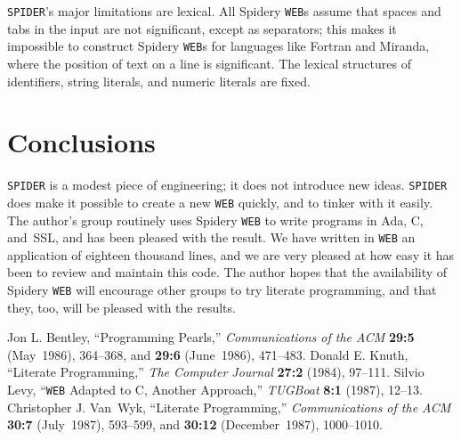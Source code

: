 {\tt SPIDER}'s major limitations are lexical.
 All Spidery {\tt WEB}s
assume that spaces and tabs in the input are not significant, except
as separators;
this makes it impossible to construct Spidery {\tt WEB}s for languages
like Fortran and Miranda, where the position of text on a line is
significant.
The lexical structures of identifiers, string literals, and numeric
literals are fixed.

\section{Conclusions}
{\tt SPIDER} is a modest piece of engineering; it does not introduce
new ideas.
{\tt SPIDER}  does make it possible to create a new {\tt WEB} quickly,
and to tinker with it easily.
The author's group routinely uses Spidery {\tt WEB} to write programs
in Ada, C, and~SSL, and has been pleased with the result.
We have written in {\tt WEB} an application of eighteen thousand
lines, and
we are very pleased at how easy it has been to review and maintain
this code.
The author hopes that the availability of Spidery {\tt WEB} will
encourage other groups to try literate programming, and that they,
too, will be pleased with the results.



\begin{thebibliography}{Van~Wyk~9999}
Jon L. Bentley, ``Programming Pearls,''
{\sl Communications of the ACM} {\bf 29:5} (May~1986), 364--368, and
{\bf 29:6} (June~1986), 471--483.
Donald E. Knuth, ``Literate Programming,'' {\sl The Computer Journal}
{\bf 27:2} (1984), 97--111.
Silvio Levy, ``{\tt WEB} Adapted to C, Another Approach,''
 {\sl TUGBoat} {\bf 8:1} (1987), 12--13.
Christopher J. Van~Wyk, ``Literate Programming,''
{\sl Communications of the ACM} {\bf 30:7} (July~1987), 593--599, and
{\bf 30:12} (December~1987), 1000--1010.
\end{thebibliography}



